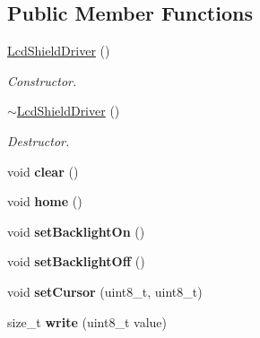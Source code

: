 \subsection*{Public Member Functions}
\begin{DoxyCompactItemize}
\item 
\mbox{\label{classLcdShieldDriver_a14d2027ac041be273d6b894a6d66bb1f}} 
\hyperlink{classLcdShieldDriver_a14d2027ac041be273d6b894a6d66bb1f}{Lcd\+Shield\+Driver} ()
\begin{DoxyCompactList}\small\item\em Constructor. \end{DoxyCompactList}\item 
\mbox{\label{classLcdShieldDriver_aaec080d1c36326c1e58642a7e28d85b1}} 
\hyperlink{classLcdShieldDriver_aaec080d1c36326c1e58642a7e28d85b1}{$\sim$\+Lcd\+Shield\+Driver} ()
\begin{DoxyCompactList}\small\item\em Destructor. \end{DoxyCompactList}\item 
\mbox{\label{classLcdShieldDriver_a43e151fc827a4d8d982bc2857b78262e}} 
void {\bfseries clear} ()
\item 
\mbox{\label{classLcdShieldDriver_a7bccc296eef476eb49984bdf8fdebb14}} 
void {\bfseries home} ()
\item 
\mbox{\label{classLcdShieldDriver_a68a86a7407fd3df5714f3351d657e499}} 
void {\bfseries set\+Backlight\+On} ()
\item 
\mbox{\label{classLcdShieldDriver_a81639e7553501343137be8984d7ea7d9}} 
void {\bfseries set\+Backlight\+Off} ()
\item 
\mbox{\label{classLcdShieldDriver_a6733a16dc0e1d58cfdfb4019ea2e6582}} 
void {\bfseries set\+Cursor} (uint8\+\_\+t, uint8\+\_\+t)
\item 
\mbox{\label{classLcdShieldDriver_aea03f93f7dfad9bc185bd77ef059c665}} 
size\+\_\+t {\bfseries write} (uint8\+\_\+t value)
\item 

\end{DoxyCompactItemize}
